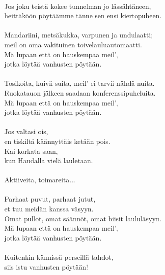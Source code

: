 \hspace{10mm} \\
Jos joku teistä kokee tunnelman jo lässähtäneen,\\
heittäköön pöytäämme tänne sen ensi kiertopuheen.\\
\hspace{10mm} \\
Mandariini, metsäkukka, varpunen ja undulaatti;\\
meil on oma vakituinen toivelauluautomaatti.\\
Mä lupaan että on hauskempaa meil',\\
jotka löytää vanhusten pöytään.\\
\hspace{10mm} \\
Tosikoita, kuivii suita, meil' ei tarvii nähdä nuita.\\
Ruokatauon jälkeen saadaan konferenssipuheluita.\\
Mä lupaan että on hauskempaa meil',\\
jotka löytää vanhusten pöytään.\\
\hspace{10mm} \\
Jos valtasi ois,\\
en tiskiltä käännyttäis ketään pois.\\
Kai korkata saan,\\
kun Haudalla vielä lauletaan.\\
\hspace{10mm} \\
Aktiiveita, toimareita...\\
\hspace{10mm} \\
Parhaat puvut, parhaat jutut,\\
et tuu meidän kanssa väsyyn.\\
Omat pullot, omat säännöt, omat biisit laululäsyyn.\\
Mä lupaan että on hauskempaa meil',\\
jotka löytää vanhusten pöytään.\\
\hspace{10mm} \\
Kuitenkin kännissä perseillä tahdot,\\
siis istu vanhusten pöytään!\\